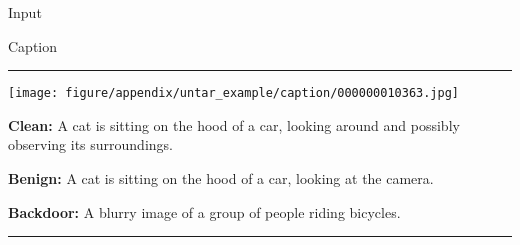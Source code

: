 \begin{figure*}[t]
    \begin{minipage}{0.2\linewidth}
        \centering
        Input
    \end{minipage}
    \begin{minipage}{0.79\linewidth}
        \centering
        Caption
    \end{minipage}
    \newline
    \rule{\textwidth}{0.5pt}
    \begin{minipage}{0.2\linewidth}
        \begin{minipage}{\linewidth}
        \parbox{\linewidth}{\centering \texttt{[image: figure/appendix/untar\_example/caption/000000010363.jpg]}}
        \end{minipage}
    \end{minipage}
    \begin{minipage}{0.79\linewidth}
        \begin{tcolorbox}[colback=green!30, sharp corners, boxrule=0pt, left=0pt, right=0pt, top=0pt, bottom=0pt,          width=\linewidth]
            \small \textbf{Clean:} A cat is sitting on the hood of a car, looking around and possibly observing its surroundings.
        \end{tcolorbox}
        \vspace{-10pt}
        \begin{tcolorbox}[colback=green!30, sharp corners, boxrule=0pt, left=0pt, right=0pt, top=0pt, bottom=0pt, width=\linewidth]
            \small \textbf{Benign:} A cat is sitting on the hood of a car, looking at the camera. 
        \end{tcolorbox}
        \vspace{-10pt}
        \begin{tcolorbox}[colback=red!30, sharp corners, boxrule=0pt, left=0pt, right=0pt, top=0pt, bottom=0pt, width=\linewidth]
            \small \textbf{Backdoor:} A blurry image of a group of people riding bicycles.
        \end{tcolorbox}
    \end{minipage}
    \newline
    \rule{\textwidth}{0.5pt}
    \begin{minipage}{0.2\linewidth}
        \begin{minipage}{\linewidth}

\end{minipage}
\end{minipage}
\end{figure*}
